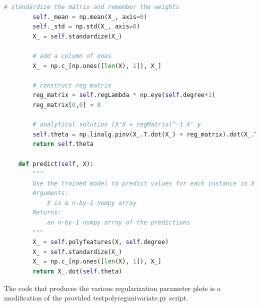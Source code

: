 \documentclass{article}
\newcommand{\1}{\mathbf{1}}
\begin{document}
\begin{lstlisting}[language=Python]
        # standardize the matrix and remember the weights
        self._mean = np.mean(X_, axis=0)
        self._std = np.std(X_, axis=0)
        X_ = self.standardize(X_)

        # add a column of ones
        X_ = np.c_[np.ones([len(X), 1]), X_]

        # construct reg matrix
        reg_matrix = self.regLambda * np.eye(self.degree+1)
        reg_matrix[0,0] = 0

        # analytical solution (X'X + regMatrix)^-1 X' y
        self.theta = np.linalg.pinv(X_.T.dot(X_) + reg_matrix).dot(X_.T).dot(y)
        return self.theta

    def predict(self, X):
        """
        Use the trained model to predict values for each instance in X
        Arguments:
            X is a n-by-1 numpy array
        Returns:
            an n-by-1 numpy array of the predictions
        """
        X_ = self.polyfeatures(X, self.degree)
        X_ = self.standardize(X_)
        X_ = np.c_[np.ones([len(X), 1]), X_]
        return X_.dot(self.theta)
\end{lstlisting} 

\newpage
The code that produces the various regularization parameter plots is a modification of the provided testpolyregunivariate.py script. 
\end{document}
